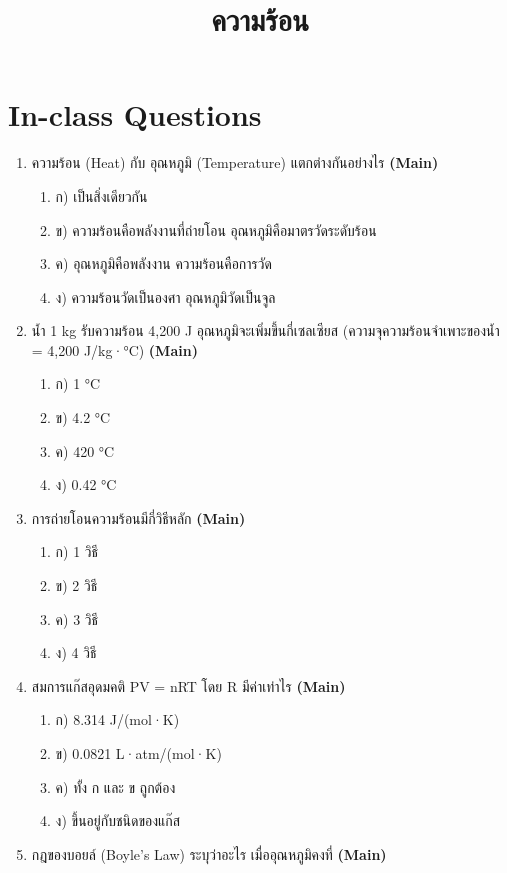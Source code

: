 \documentclass[12pt]{article}
\begin{document}
\title{ความร้อน}
\maketitle
\section*{In-class Questions}
\begin{enumerate}[label=\arabic*.]
\item ความร้อน (Heat) กับ อุณหภูมิ (Temperature) แตกต่างกันอย่างไร \hfill \textbf{\small (Main)}
\begin{enumerate}[label=)]
\item ก) เป็นสิ่งเดียวกัน
\item ข) ความร้อนคือพลังงานที่ถ่ายโอน อุณหภูมิคือมาตรวัดระดับร้อน
\item ค) อุณหภูมิคือพลังงาน ความร้อนคือการวัด
\item ง) ความร้อนวัดเป็นองศา อุณหภูมิวัดเป็นจูล
\end{enumerate}
\item น้ำ 1 kg รับความร้อน 4,200 J อุณหภูมิจะเพิ่มขึ้นกี่เซลเซียส (ความจุความร้อนจำเพาะของน้ำ = 4,200 J/kg·°C) \hfill \textbf{\small (Main)}
\begin{enumerate}[label=)]
\item ก) 1 °C
\item ข) 4.2 °C
\item ค) 420 °C
\item ง) 0.42 °C
\end{enumerate}
\item การถ่ายโอนความร้อนมีกี่วิธีหลัก \hfill \textbf{\small (Main)}
\begin{enumerate}[label=)]
\item ก) 1 วิธี
\item ข) 2 วิธี
\item ค) 3 วิธี
\item ง) 4 วิธี
\end{enumerate}
\item สมการแก๊สอุดมคติ PV = nRT โดย R มีค่าเท่าไร \hfill \textbf{\small (Main)}
\begin{enumerate}[label=)]
\item ก) 8.314 J/(mol·K)
\item ข) 0.0821 L·atm/(mol·K)
\item ค) ทั้ง ก และ ข ถูกต้อง
\item ง) ขึ้นอยู่กับชนิดของแก๊ส
\end{enumerate}
\item กฎของบอยล์ (Boyle's Law) ระบุว่าอะไร เมื่ออุณหภูมิคงที่ \hfill \textbf{\small (Main)}

\end{enumerate}
\end{document}
